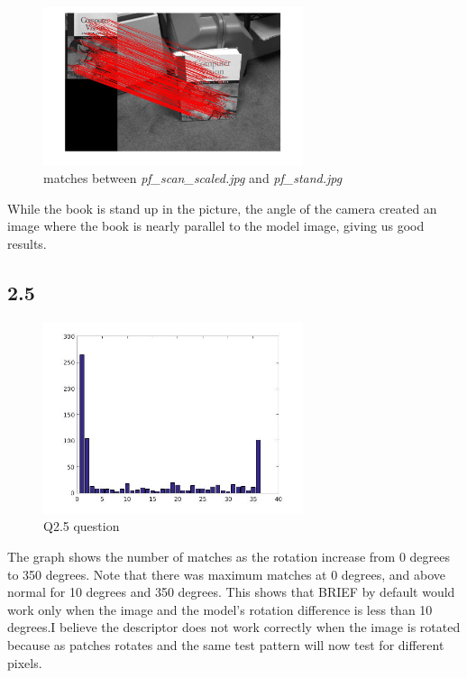 \documentclass{article}
\begin{document}
\begin{figure}[H]
    \centering
    \includegraphics[width=3.0in]{q2-4-1-stand}
    \caption{matches between \textit{pf\_scan\_scaled.jpg} and \textit{pf\_stand.jpg}}
\end{figure}
While the book is stand up in the picture, the angle of the camera created an image where the book is nearly parallel to the model image, giving us good results.

\subsection*{2.5}
\begin{figure}[H]
    \centering
    \includegraphics[width=3.0in]{q2_5}
    \caption{Q2.5 question}
\end{figure}
The graph shows the number of matches as the rotation increase from 0 degrees to 350 degrees. Note that there was maximum matches at 0 degrees, and above normal for 10 degrees and 350 degrees. This shows that BRIEF by default would work only when the image and the model's rotation difference is less than 10 degrees.I believe the descriptor does not work correctly when the image is rotated because as patches rotates and the same test pattern will now test for different pixels.
\end{document}
